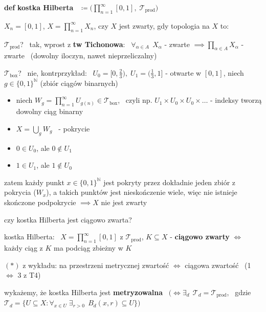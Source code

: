 \documentclass[a4paper,12pt]{article}
\begin{document}
\bigskip
\textbf{def} \; \textbf{kostka Hilberta} \, \(\coloneqq \big(\prod_{n=1}^{\infty} [0, 1], \; \mathcal{T}_{\text{prod}}\big)\)

\bigskip
{} \; \(X_n = [0, 1]\), \; \(X = \prod_{n=1}^{\infty} X_n\), \; czy \(X\) jest zwarty, gdy topologia na \(X\) to:
\begin{podpunkty}
    \item \(\mathcal{T}_{\text{prod}}\)? \, tak, wprost z \textbf{tw Tichonowa}: \, \(\forall_{\alpha \in A} \;\, X_\alpha\) - zwarte \(\implies \prod_{\alpha \in A} X_\alpha\) - zwarte \, (dowolny iloczyn, nawet nieprzeliczalny)
    \item \(\mathcal{T}_{\text{box}}\)? \, nie, kontrprzykład: \, \(U_0 = \big[0, \frac{2}{3}\big), \; U_1 = \big(\frac{1}{3}, 1\big]\) - otwarte w \([0, 1]\), \; niech \(g \in \{0, 1\}^{\mathbb{N}}\) (zbiór ciągów binarnych)
    \begin{itemize}
        \item niech \(W_g = \prod_{n=1}^{\infty} U_{g(n)} \in \mathcal{T}_{\text{box}}\), \, czyli np. \(U_1 \times U_0 \times U_0 \times \dots\) - indeksy tworzą dowolny ciąg binarny
        \item \(X = \bigcup_g W_g\) \, - pokrycie
        \item \(0 \in U_0\), ale \(0 \notin U_1\)
        \item \(1 \in U_1\), ale \(1 \notin U_0\)
    \end{itemize}
    zatem każdy punkt \(x \in \{0, 1\}^{\mathbb{N}}\) jest pokryty przez dokładnie jeden zbiór z pokrycia (\(W_x\)), a takich punktów jest nieskończenie wiele, więc nie istnieje skończone podpokrycie \(\implies X\) nie jest zwarty
\end{podpunkty}

\newpage
{}

\bigskip
{} \; czy kostka Hilberta jest ciągowo zwarta?

\smallskip
kostka Hilberta: \, \(X = \prod_{n=1}^{\infty} [0, 1]\) z \(\mathcal{T}_{\text{prod}}\), \; \(K \subseteq X\) - \textbf{ciągowo zwarty} \(\iff\) każdy ciąg z \(K\) ma podciąg zbieżny w \(K\)

\smallskip
\((*)\) \; z wykładu: na przestrzeni metrycznej zwartość \(\iff\) ciągowa zwartość \, (1 \(\iff\) 3 z T4)

\smallskip
wykażemy, że kostka Hilberta jest \textbf{metryzowalna} \, \(\big(\iff \exists_d \;\, \mathcal{T}_d = \mathcal{T}_{\text{prod}}\), \, gdzie \(\mathcal{T}_d = \{U \subseteq X : \forall_{x \in U} \; \exists_{r > 0} \;\, B_d(x, r) \subseteq U\}\big)\)
\end{document}
